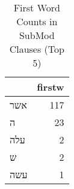 \begin{table}[htbp!]
\centering
\caption{First Word Counts in SubMod Clauses (Top 5)}
\label{table:SubMod_front}
\begin{tabular}{lr}
\toprule
{} &  firstw \\
\midrule
\texthebrew{אשר} &     117 \\
\texthebrew{ה}   &      23 \\
\texthebrew{עלה} &       2 \\
\texthebrew{ש}   &       2 \\
\texthebrew{עשה} &       1 \\
\bottomrule
\end{tabular}
\end{table}
